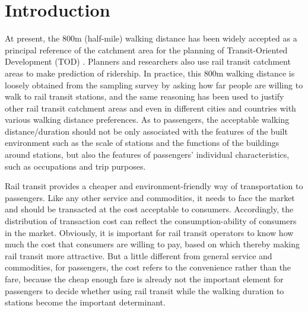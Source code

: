 \documentclass[sustainability,article,submit,moreauthors,pdftex,10pt,a4paper]{Definitions/mdpi}
\begin{document}


\section{Introduction}

At present, the 800m (half-mile) walking distance has been widely accepted as a principal reference of the catchment area for the planning of Transit-Oriented Development (TOD) \cite{kuby2004factors,gutierrez2011transit,cardozo2012application,zhao2013influences}. Planners and researchers also use rail transit catchment areas to make prediction of ridership. In practice, this 800m walking distance is loosely obtained from the sampling survey by asking how far people are willing to walk to rail transit stations, and the same reasoning has been used to justify other rail transit catchment areas and even in different cities and countries with various walking distance preferences. As to passengers, the acceptable walking distance/duration should not be only associated with the features of the built environment such as the scale of stations and the functions of the buildings around stations, but also the features of passengers' individual characteristics, such as occupations and trip purposes.

%
Rail transit provides a cheaper and environment-friendly way of transportation to passengers. Like any other service and commodities, it needs to face the market and should be transacted at the cost acceptable to consumers. Accordingly, the distribution of transaction cost can reflect the consumption-ability of consumers in the market. Obviously, it is important for rail transit operators to know how much the cost that consumers are willing to pay, based on which thereby making rail transit more attractive. But a little different from general service and commodities, for passengers, the cost refers to the convenience rather than the fare, because the cheap enough fare is already not the important element for passengers to decide whether using rail transit while the walking duration to stations become the important determinant.
\end{document}
